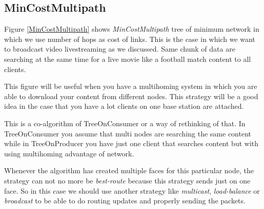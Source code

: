 \subsection{MinCostMultipath}
Figure \ref{MinCostMultipath} shows \textit{MinCostMultipath} tree of minimum network in which we use number of hops as cost of links. This is the case in which we want to broadcast video livestreaming as we discussed. Same chunk of data are searching at the same time for a live movie like a football match content to all clients.


This figure will be useful when you have a multihoming system in which you are able to download your content from different nodes. This strategy will be a good idea in the case that you have a lot clients on one base station are attached.

This is a co-algorithm of TreeOnConsumer or a way of rethinking of that. In TreeOnConsumer you assume that multi nodes are searching the same content while in TreeOnProducer you have just one client that searches content but with using multihoming advantage of network. 

Whenever the algorithm has created multiple faces for this particular node, the strategy can not no more be \textit{best-route} because this strategy sends just on one face. So in this case we should use another strategy like \textit{multicast}, \textit{load-balance} or \textit{broadcast} to be able to do routing updates and properly sending the packets.
 
